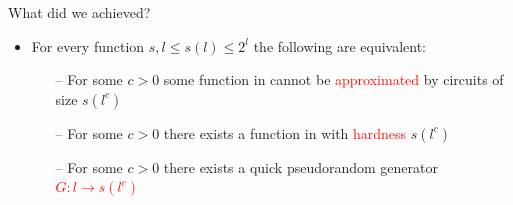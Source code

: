 \documentclass[xcolor={table,dvipsnames,usenames}]{beamer}
\begin{document}
\begin{frame}{What did we achieved?}
\begin{itemize}
	\item  For every function $s, l \leq s(l) \leq 2^l$ the following are equivalent:
	\pause
	\begin{itemize}
		\item[--] For some $c > 0$ some function in {\EXPTIME} cannot be \textcolor{red}{approximated} by circuits of	size $s(l^c)$
		\pause
		\item[--] For some $c > 0$ there exists a function in {\EXPTIME} with \textcolor{red}{hardness} $s(l^c)$
		\pause
		\item[--] For some $c > 0$ there exists a quick pseudorandom generator \textcolor{red}{$G:l \rightarrow s(l^c)$}
	\end{itemize}
\end{itemize}
\end{frame}
\end{document}

